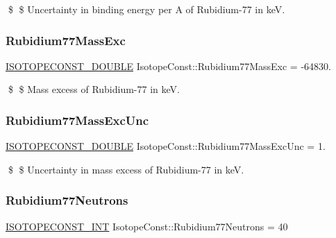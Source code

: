 \$ \$ Uncertainty in binding energy per A of Rubidium-\/77 in keV. \mbox{\label{group___isotope_const-_rubidium-_rb77_gab14133d2764b14b8134f716b4759a465}} 
\subsubsection{\texorpdfstring{Rubidium77\+Mass\+Exc}{Rubidium77MassExc}}
{\footnotesize\ttfamily \mbox{\hyperlink{group___isotope_const-_macros_ga8f45a7272ce02c0b4c65c44636ed719a}{I\+S\+O\+T\+O\+P\+E\+C\+O\+N\+S\+T\+\_\+\+D\+O\+U\+B\+LE}} Isotope\+Const\+::\+Rubidium77\+Mass\+Exc = -\/64830.}

\$ \$ Mass excess of Rubidium-\/77 in keV. \mbox{\label{group___isotope_const-_rubidium-_rb77_ga3714d93b4a600b373ebbc5bb9c2bc0d8}} 
\subsubsection{\texorpdfstring{Rubidium77\+Mass\+Exc\+Unc}{Rubidium77MassExcUnc}}
{\footnotesize\ttfamily \mbox{\hyperlink{group___isotope_const-_macros_ga8f45a7272ce02c0b4c65c44636ed719a}{I\+S\+O\+T\+O\+P\+E\+C\+O\+N\+S\+T\+\_\+\+D\+O\+U\+B\+LE}} Isotope\+Const\+::\+Rubidium77\+Mass\+Exc\+Unc = 1.}

\$ \$ Uncertainty in mass excess of Rubidium-\/77 in keV. \mbox{\label{group___isotope_const-_rubidium-_rb77_ga23f5315ab16d5c9bdd3db634c57f2c35}} 
\subsubsection{\texorpdfstring{Rubidium77\+Neutrons}{Rubidium77Neutrons}}
{\footnotesize\ttfamily \mbox{\hyperlink{group___isotope_const-_macros_ga5f18360b3e99483a35c32d789e62621c}{I\+S\+O\+T\+O\+P\+E\+C\+O\+N\+S\+T\+\_\+\+I\+NT}} Isotope\+Const\+::\+Rubidium77\+Neutrons = 40}

